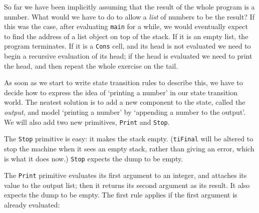 So far we have been implicitly assuming that the result of the
whole program is a number.
What would we have to do to allow a {\em list\/} of numbers to be the result?
If this was the case, after evaluating \mbox{\tt main} for a while,
we would eventually expect to find the address of a list object
on top of the stack.
If it is an empty list, the program terminates.
If it is a \mbox{\tt Cons} cell, and
its head is not evaluated we need to begin a recursive evaluation
of its head; if the head is evaluated we need to print the head, and then
repeat the whole exercise on the tail.

As soon as we start to write state transition rules to describe this, we
have to decide how to express the idea of `printing a number' in our state
transition world.  The neatest solution is to add a new component
to the state, called the {\em output}, and model `printing a number'
by `appending a number to the output'.  We will also add two
new primitives, \mbox{\tt Print} and \mbox{\tt Stop}.

The \mbox{\tt Stop} primitive is easy: it makes the stack empty.
(\mbox{\tt tiFinal} will be altered to stop the machine when it sees an empty stack,
rather than giving an error, which is what it does now.)
\mbox{\tt Stop} expects the dump to be empty.
\label{rule:stop}

The \mbox{\tt Print} primitive evaluates its first argument to an integer,
and attaches its value
to the output list; then it returns its second argument as its result.
It also expects the dump to be empty.
The first rule applies if the first argument is already evaluated:
\label{rule:print}

